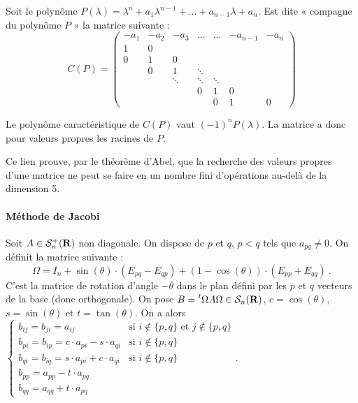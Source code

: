 \begin{defn}
	Soit le polynôme $P(\lambda) = \lambda^n + a_1 \lambda^{n-1} + \ldots + a_{n-1} \lambda + a_n$.
	Est dite « compagne du polynôme $P$ » la matrice suivante :
	$$C(P) = \begin{pmatrix}
		-a_1 & -a_2 & -a_3   & \ldots & \ldots & -a_{n-1} & -a_n \\
		1    & 0    &        &        &        &          &      \\
		0    & 1    & 0      &        &        &          &      \\
		     & 0    & 1      & \ddots &        &          &      \\
		     &      & \ddots & \ddots & \ddots &          &      \\
		     &      &        & 0      & 1      & 0        &      \\
		     &      &        &        & 0      & 1        & 0    \end{pmatrix}$$
\end{defn}

\begin{pop}
	Le polynôme caractéristique de $C(P)$ vaut $(-1)^n P(\lambda)$.
	La matrice a donc pour valeurs propres les racines de $P$.
\end{pop}

Ce lien prouve, par le théorème d'Abel, que la recherche des valeurs propres d'une matrice ne peut se faire en un nombre fini d'opérations au-delà de la dimension 5.

\paragraph{Méthode de Jacobi}
Soit $A \in \mathcal{S}^+_n(\mathbf{R})$ non diagonale.
On dispose de $p$ et $q$, $p < q$ tels que $a_{pq} \neq 0$.
On définit la matrice suivante :
$$\Omega = I_n + \sin(\theta) \cdot (E_{pq} - E_{qp}) + (1 - \cos(\theta)) \cdot (E_{pp} + E_{qq})\ .$$
C'est la matrice de rotation d'angle $-\theta$ dans le plan défini par les $p$ et $q$ vecteurs de la base (donc orthogonale).
On pose $B = \transp{\Omega} A \Omega \in \Sym_n(\R)$, $c = \cos(\theta)$, $s = \sin(\theta)$ et $t = \tan(\theta)$.
On a alors\\
$\left\{ \begin{array}{ll}
	b_{ij} = b_{ji} = a_{ij} & \text{si } i \not\in \{ p, q \} \text{ et } j \notin \{ p, q \} \\
	b_{pi} = b_{ip} = c \cdot a_{pi} - s \cdot a_{qi} & \text{si } i \not\in \{ p, q \} \\
	b_{qi} = b_{iq} = s \cdot a_{pi} + c \cdot a_{qi} & \text{si } i \not\in \{ p, q \} \\
	b_{pp} = a_{pp} - t \cdot  a_{pq} \\
	b_{qq} = a_{qq} + t \cdot a_{pq} \end{array}
\right.$.


